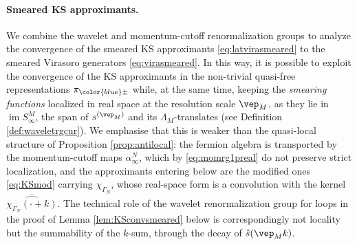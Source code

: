 \documentclass[a4paper, 11pt]{article}
\DeclareMathOperator{\1}{\mathds{1}}
\DeclareMathOperator{\im}{im}
\begin{document}
\paragraph{Smeared KS approximants.}
\label{sec:KSsmeared}
We combine the wavelet and momentum-cutoff renormalization groups to analyze the convergence of the smeared KS approximants \eqref{eq:latvirasmeared} to the smeared Virasoro generators \eqref{eq:virasmeared}. In this way, it is possible to exploit the convergence of the KS approximants in the non-trivial quasi-free representations $\pi_{{\color{blue}\pm}}$ while, at the same time, keeping the \emph{smearing functions} localized in real space at the resolution scale $\vep_{M}$, as they lie in $\im S^{M}_{\infty}$, the span of $s^{(\vep_{M})}$ and its $\Lambda_{M}$-translates (see Definition \ref{def:waveletrgcur}). We emphasise that this is weaker than the quasi-local structure of Proposition \ref{prop:antilocal}: the fermion algebra is transported by the momentum-cutoff maps $\alpha^{N}_{\infty}$, which by \eqref{eq:momrg1preal} do not preserve strict localization, and the approximants entering below are the modified ones \eqref{eq:KSmod} carrying $\chi_{\Gamma_{N}}$, whose real-space form is a convolution with the kernel $\overline{\widehat{\chi_{\Gamma_{N}}(\cdot+k)}}$. The technical role of the wavelet renormalization group for loops in the proof of Lemma \ref{lem:KSconvsmeared} below is correspondingly not locality but the summability of the $k$-sum, through the decay of $\hat{s}(\vep_{M}k)$.

\bigskip
\end{document}
